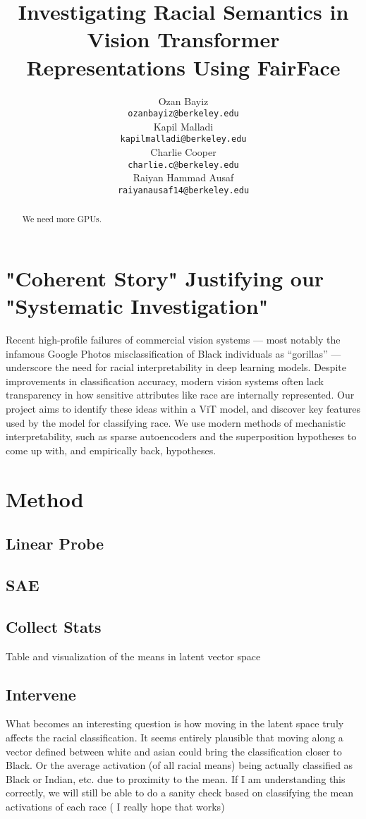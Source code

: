 \documentclass{article}
\title{Investigating Racial Semantics in Vision Transformer Representations Using FairFace}
\author{ Ozan Bayiz \\
	\texttt{ozanbayiz@berkeley.edu} \\
	\And
	Kapil Malladi \\
	\texttt{kapilmalladi@berkeley.edu} \\
	\AND
	Charlie Cooper \\
	\texttt{charlie.c@berkeley.edu} \\
	\And
	Raiyan Hammad Ausaf \\
	\texttt{raiyanausaf14@berkeley.edu} \\
}
\begin{document}
\maketitle

\begin{abstract}
We need more GPUs.
\end{abstract}


\section{"Coherent Story" Justifying our "Systematic Investigation"}
Recent high-profile failures of commercial vision systems — most notably the infamous Google Photos misclassification of Black individuals as “gorillas” — underscore the need for racial interpretability in deep learning models. Despite improvements in classification accuracy, modern vision systems often lack transparency in how sensitive attributes like race are internally represented. Our project aims to identify these ideas within a ViT model, and discover key features used by the model for classifying race. We use modern methods of mechanistic interpretability, such as sparse autoencoders and the superposition hypotheses to come up with, and empirically back, hypotheses.




\section{Method}
\subsection{Linear Probe}
\subsection{SAE}
\subsection{Collect Stats}
Table and visualization of the means in latent vector space
\subsection{Intervene}
What becomes an interesting question is how moving in the latent space truly affects the racial classification. It seems entirely plausible that moving along a vector defined between white and asian could bring the classification closer to Black. Or the average activation (of all racial means) being actually classified as Black or Indian, etc. due to proximity to the mean. If I am understanding this correctly, we will still be able to do a sanity check based on classifying the mean activations of each race ( I really hope that works)
\end{document}
